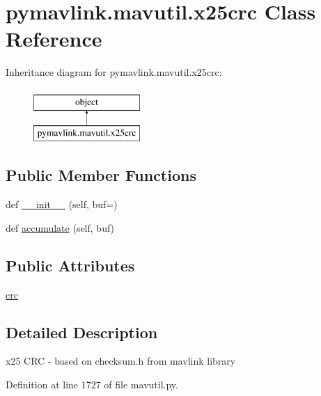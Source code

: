 \hypertarget{classpymavlink_1_1mavutil_1_1x25crc}{}\section{pymavlink.\+mavutil.\+x25crc Class Reference}
\label{classpymavlink_1_1mavutil_1_1x25crc}
Inheritance diagram for pymavlink.\+mavutil.\+x25crc\+:\begin{figure}[H]
\begin{center}
\leavevmode
\includegraphics[height=2.000000cm]{classpymavlink_1_1mavutil_1_1x25crc}
\end{center}
\end{figure}
\subsection*{Public Member Functions}
\begin{DoxyCompactItemize}
\item 
def \mbox{\hyperlink{classpymavlink_1_1mavutil_1_1x25crc_a2ea5688ad6f11d1458495c83b5fb8369}{\+\_\+\+\_\+init\+\_\+\+\_\+}} (self, buf=\textquotesingle{}\textquotesingle{})
\item 
def \mbox{\hyperlink{classpymavlink_1_1mavutil_1_1x25crc_a0b923d79c74f524672adb0dc2ab0c337}{accumulate}} (self, buf)
\end{DoxyCompactItemize}
\subsection*{Public Attributes}
\begin{DoxyCompactItemize}
\item 
\mbox{\hyperlink{classpymavlink_1_1mavutil_1_1x25crc_a89ee93fb5da26919551f8765f70f476c}{crc}}
\end{DoxyCompactItemize}


\subsection{Detailed Description}
\begin{DoxyVerb}x25 CRC - based on checksum.h from mavlink library\end{DoxyVerb}
 

Definition at line 1727 of file mavutil.\+py.



